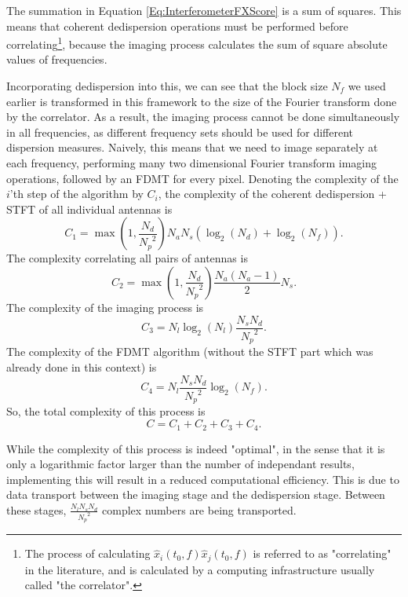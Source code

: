 \documentclass[iop]{emulateapj}
\begin{document}
The summation in Equation \ref{Eq:InterferometerFXScore} is a sum of squares. This means that coherent dedispersion operations must be performed before correlating\footnote{The process of calculating $\hat{x}_i(t_0,f)\hat{x}_j(t_0,f)$ is referred to as "correlating" in the literature, and is calculated by a computing infrastructure usually called "the correlator".}, because the imaging process calculates the sum of square absolute values of frequencies.

Incorporating dedispersion into this, we can see that the block size ${N_{f}}$ we used earlier is transformed in this framework to the size of the Fourier transform done by the correlator. As a result, the imaging process cannot be done simultaneously in all frequencies, as different frequency sets should be used for different dispersion measures.
Naively, this means that we need to image separately at each frequency, performing many two dimensional Fourier transform imaging operations, followed by an FDMT for every pixel.
Denoting the complexity of the $i$'th step of the algorithm by $C_i$, the complexity of the coherent dedispersion + STFT of all individual antennas is
\begin{equation}
C_1 = \max\left(1,\frac{{N_{d}}}{{N_{p}}^2}\right)N_aN_s(\log_2({N_{d}}) + \log_2(N_f)).
\end{equation}
The complexity correlating all pairs of antennas is
\begin{equation} C_2 = \max\left(1,\frac{{N_{d}}}{{N_{p}}^2}\right)\frac{N_a(N_a-1)}{2}{N_{s}}. \end{equation}
The complexity of the imaging process is  
\begin{equation} C_3 =  N_l\log_{2}(N_l)\frac{{N_{s}}{N_{d}}}{{N_{p}}^2}.  \end{equation}
The complexity of the FDMT algorithm (without the STFT part which was already done in this context) is 
\begin{equation} C_4 = N_l\frac{{N_{s}}{N_{d}}}{{N_{p}}^2}\log_{2}({N_{f}}).
\end{equation}
So, the total complexity of this process is
\begin{equation}
C = C_1 + C_2 + C_3 + C_4.
\end{equation}

While the complexity of this process is indeed "optimal", in the sense that it is only a logarithmic factor larger than the number of independant results, implementing this will result in a reduced computational efficiency. This is due to data transport between the imaging stage and the dedispersion stage.
Between these stages, $\frac{N_l{N_{s}}{N_{d}}}{{N_{p}}^2}$ complex numbers are being transported.
\end{document}
